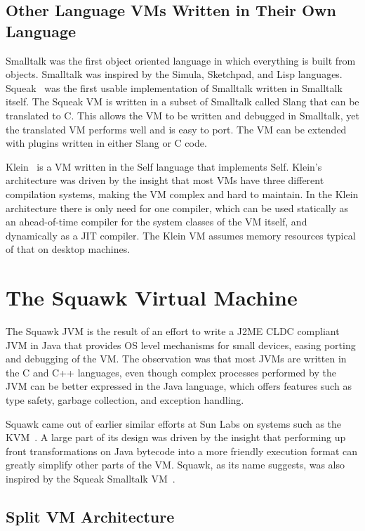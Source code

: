 \documentclass{sigplanconf}
\begin{document}
\subsection{Other Language VMs Written in Their Own Language}

Smalltalk was the first object oriented language in which everything is 
built from objects.  Smalltalk was inspired by the Simula, Sketchpad, 
and Lisp languages.  
Squeak~\cite{Inga97} was the first usable implementation of Smalltalk 
written in Smalltalk itself.  The Squeak VM is written in a subset of
Smalltalk called Slang that can be translated to C.  This allows the 
VM to be written and debugged in Smalltalk, yet the translated VM performs 
well and is easy to port.  
The VM can be extended with plugins written in either Slang or C code. 

Klein~\cite{Unga05} is a VM written in the Self language that implements 
Self. 
Klein's architecture was driven by the insight that most VMs 
have three different compilation systems, making the VM complex and
hard to maintain. 
In the Klein architecture there is only need for one compiler, which
can be used statically as an ahead-of-time compiler for the system 
classes of the VM itself, and dynamically as a JIT compiler.
The Klein VM assumes memory resources typical of that on desktop machines. 


\section{The Squawk Virtual Machine}
\label{sec-squawk}

The Squawk JVM is the result of an effort to write a J2ME CLDC 
compliant JVM in Java that provides OS level mechanisms for small
devices, easing porting and debugging of the VM.
The observation was that most JVMs are written in the C and C++ 
languages, even though complex processes performed by the JVM can be 
better expressed in the Java language, which offers features such as 
type safety, garbage collection, and exception handling. 

Squawk came out of earlier similar efforts at Sun Labs on systems such
as the KVM~\cite{Taiv99}.
A large part of its design was driven by the insight that performing up front
transformations on Java bytecode into a more friendly execution format
can greatly simplify other parts of the VM.
Squawk, as its name suggests, was also inspired by the Squeak Smalltalk 
VM~\cite{Inga97}. 


\subsection{Split VM Architecture}
\end{document}
